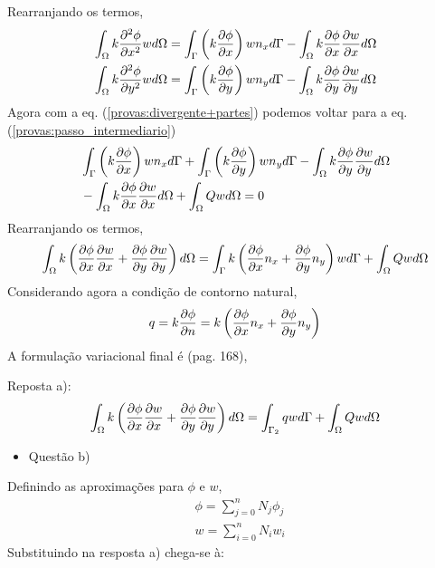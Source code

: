 %
Rearranjando os termos,
%
\begin{equation}
	\begin{split}
		&\int_{\Omega} k \frac{\partial^2 \phi}{\partial x^2} w d\Omega = \int_{\Gamma} \left(k \frac{\partial \phi}{\partial x}\right) w n_x d\Gamma - \int_{\Omega} k \frac{\partial \phi}{\partial x} \frac{\partial w}{\partial x} d\Omega\\
		&\int_{\Omega} k \frac{\partial^2 \phi}{\partial y^2} w d\Omega = \int_{\Gamma} \left(k \frac{\partial \phi}{\partial y}\right) w n_y d\Gamma - \int_{\Omega} k \frac{\partial \phi}{\partial y} \frac{\partial w}{\partial y} d\Omega\\
	\end{split}
	\label{provas:divergente+partes}
\end{equation}
%
Agora com a eq. (\ref{provas:divergente+partes}) podemos voltar para a eq. (\ref{provas:passo_intermediario})
%
\begin{equation}
	\begin{aligned}
	&\int_{\Gamma} \left(k \frac{\partial \phi}{\partial x}\right) w n_x d\Gamma + \int_{\Gamma} \left(k \frac{\partial \phi}{\partial y}\right) w n_y d\Gamma - \int_{\Omega} k \frac{\partial \phi}{\partial y}\frac{\partial w}{\partial y} d\Omega\\
	& - \int_{\Omega} k \frac{\partial \phi}{\partial x} \frac{\partial w}{\partial x} d\Omega + \int_{\Omega} Q w d\Omega = 0 
	\end{aligned}
\end{equation}
%
Rearranjando os termos,
%
\begin{equation}
\int_{\Omega} k \left(\frac{\partial \phi}{\partial x} \frac{\partial w}{\partial x} + \frac{\partial \phi}{\partial y} \frac{\partial w}{\partial y} \right) d\Omega = \int_{\Gamma} k \left(\frac{\partial \phi}{\partial x} n_x + \frac{\partial \phi}{\partial y} n_y \right) w d\Gamma + \int_{\Omega} Q w d\Omega 
\end{equation}
%
Considerando agora a condição de contorno natural,
%
\begin{equation}
	q = k \frac{\partial \phi}{\partial n} = k \left(\frac{\partial \phi}{\partial x} n_x + \frac{\partial \phi}{\partial y} n_y\right)
\end{equation}
%
A formulação variacional final é (pag. 168),

\color{blue}
Reposta a):
\begin{equation}
	\int_{\Omega} k \left(\frac{\partial \phi}{\partial x} \frac{\partial w}{\partial x} + \frac{\partial \phi}{\partial y} \frac{\partial w}{\partial y} \right) d\Omega = \int_{\Gamma_2} q w d\Gamma + \int_{\Omega} Q w d\Omega 
\end{equation}
\color{black}
%
%
\begin{itemize}
	\item Questão b)
\end{itemize}
%
Definindo as aproximações para $\phi$ e $w$,
% 
\begin{equation}
	\begin{split}
		&\phi = \sum_{j=0}^n N_j \phi_j\\
		&w = \sum_{i=0}^n N_i w_i
	\end{split}
\end{equation}
%
Substituindo na resposta a) chega-se à:

